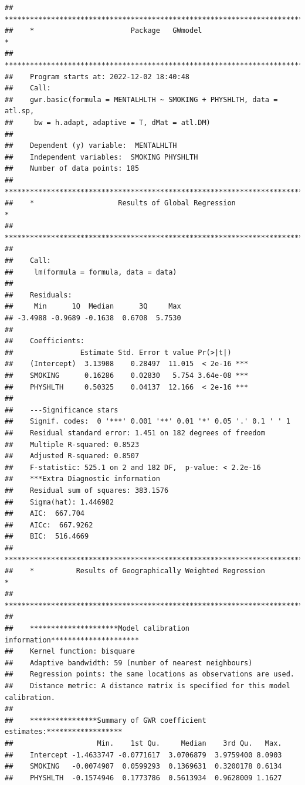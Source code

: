 \documentclass[
]{book}
\begin{document}
\begin{verbatim}
##    ***********************************************************************
##    *                       Package   GWmodel                             *
##    ***********************************************************************
##    Program starts at: 2022-12-02 18:40:48 
##    Call:
##    gwr.basic(formula = MENTALHLTH ~ SMOKING + PHYSHLTH, data = atl.sp, 
##     bw = h.adapt, adaptive = T, dMat = atl.DM)
## 
##    Dependent (y) variable:  MENTALHLTH
##    Independent variables:  SMOKING PHYSHLTH
##    Number of data points: 185
##    ***********************************************************************
##    *                    Results of Global Regression                     *
##    ***********************************************************************
## 
##    Call:
##     lm(formula = formula, data = data)
## 
##    Residuals:
##     Min      1Q  Median      3Q     Max 
## -3.4988 -0.9689 -0.1638  0.6708  5.7530 
## 
##    Coefficients:
##                Estimate Std. Error t value Pr(>|t|)    
##    (Intercept)  3.13908    0.28497  11.015  < 2e-16 ***
##    SMOKING      0.16286    0.02830   5.754 3.64e-08 ***
##    PHYSHLTH     0.50325    0.04137  12.166  < 2e-16 ***
## 
##    ---Significance stars
##    Signif. codes:  0 '***' 0.001 '**' 0.01 '*' 0.05 '.' 0.1 ' ' 1 
##    Residual standard error: 1.451 on 182 degrees of freedom
##    Multiple R-squared: 0.8523
##    Adjusted R-squared: 0.8507 
##    F-statistic: 525.1 on 2 and 182 DF,  p-value: < 2.2e-16 
##    ***Extra Diagnostic information
##    Residual sum of squares: 383.1576
##    Sigma(hat): 1.446982
##    AIC:  667.704
##    AICc:  667.9262
##    BIC:  516.4669
##    ***********************************************************************
##    *          Results of Geographically Weighted Regression              *
##    ***********************************************************************
## 
##    *********************Model calibration information*********************
##    Kernel function: bisquare 
##    Adaptive bandwidth: 59 (number of nearest neighbours)
##    Regression points: the same locations as observations are used.
##    Distance metric: A distance matrix is specified for this model calibration.
## 
##    ****************Summary of GWR coefficient estimates:******************
##                    Min.    1st Qu.     Median    3rd Qu.   Max.
##    Intercept -1.4633747 -0.0771617  3.0706879  3.9759400 8.0903
##    SMOKING   -0.0074907  0.0599293  0.1369631  0.3200178 0.6134
##    PHYSHLTH  -0.1574946  0.1773786  0.5613934  0.9628009 1.1627

\end{verbatim}
\end{document}
